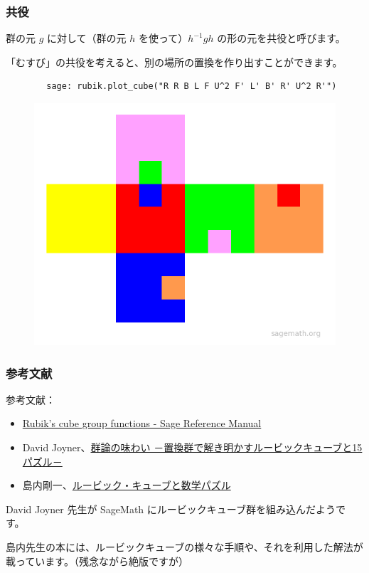\documentclass{beamer}
\begin{document}
\begin{frame}[fragile=singleslide]
    \frametitle{共役}

    群の元 \(g\) に対して（群の元 \(h\) を使って）\(h^{-1} g h\) の形の元を共役と呼びます。

    「むすび」の共役を考えると、別の場所の置換を作り出すことができます。

    \begin{verbatim}
        sage: rubik.plot_cube("R R B L F U^2 F' L' B' R' U^2 R'")
    \end{verbatim}

    \begin{figure}
        \includegraphics[scale=0.35]{images/plot_cube_musubi2.png}
    \end{figure}
\end{frame}

\begin{frame}
    \frametitle{参考文献}

    参考文献：

    \begin{itemize}
        \item \href{https://doc.sagemath.org/html/en/reference/groups/sage/groups/perm_gps/cubegroup.html}{Rubik's cube group functions - Sage Reference Manual}
        \item David Joyner、\href{https://www.amazon.co.jp/dp/4320019415/ref=nosim?tag=usamik-22}{群論の味わい －置換群で解き明かすルービックキューブと15パズル－}
        \item 島内剛一、\href{https://www.amazon.co.jp/dp/4535785376/ref=nosim?tag=usamik-22}{ルービック・キューブと数学パズル}
    \end{itemize}

    \bigskip

    David Joyner 先生が SageMath にルービックキューブ群を組み込んだようです。

    \bigskip

    島内先生の本には、ルービックキューブの様々な手順や、それを利用した解法が載っています。（残念ながら絶版ですが）
\end{frame}
\end{document}
